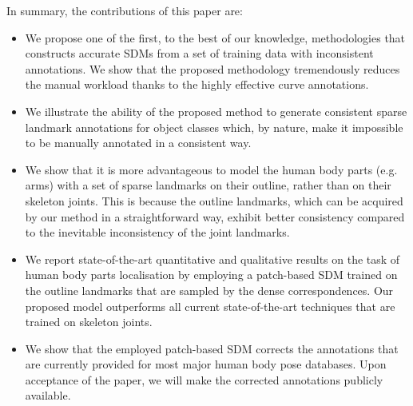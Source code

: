 In summary, the contributions of this paper are:
\begin{itemize}

  \item We propose one of the first, to the best of our knowledge, methodologies that constructs accurate SDMs from a set of training data with inconsistent annotations. We show that the proposed methodology tremendously reduces the manual workload thanks to the highly effective curve annotations.

  \item We illustrate the ability of the proposed method to generate consistent sparse landmark annotations for object classes which, by nature, make it impossible to be manually annotated in a consistent way.

  \item We show that it is more advantageous to model the human body parts (e.g. arms) with a set of sparse landmarks on their outline, rather than on their skeleton joints. This is because the outline landmarks, which can be acquired by our method in a straightforward way, exhibit better consistency compared to the inevitable inconsistency of the joint landmarks.

  \item We report state-of-the-art quantitative and qualitative results on the task of human body parts localisation by employing a patch-based SDM trained on the outline landmarks that are sampled by the dense correspondences. Our proposed model outperforms all current state-of-the-art techniques that are trained on skeleton joints.

  \item We show that the employed patch-based SDM corrects the annotations that are currently provided for most major human body pose databases. Upon acceptance of the paper, we will make the corrected annotations publicly available.

\end{itemize}








